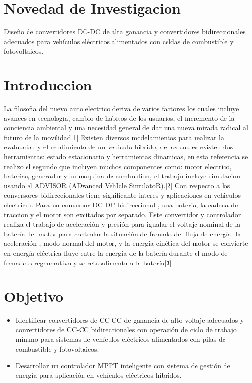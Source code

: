\documentclass[12pt]{article}
\begin{document}
\section{Novedad de Investigacion}
Diseño de convertidores DC-DC de alta ganancia y convertidores bidireccionales adecuados para vehículos eléctricos alimentados con celdas de combustible y fotovoltaicos.

\section{Introduccion}
La filosofia del nuevo auto electrico deriva de varios factores los cuales incluye avances en tecnologia, cambio de habitos de los usuarios, el incremento de la conciencia ambiental y una necesidad general de dar una nueva mirada radical al futuro de la movilidad[1]
Existen diversos modelamientos para realizar la evaluacion y el rendimiento de un vehiculo hibrido, de los cuales existen dos herramientas: estado estacionario y herramientas dinamicas, en esta referencia se realizo el segundo que incluyen muchos componentes como: motor electrico, baterias, generador y su maquina de combustion, el trabajo incluye simulacion usando el ADVISOR (ADvanced VehIcle SimulatoR).[2]
Con respecto a los conversores bidireccionales tiene significante interes y aplicaciones en vehiculos electricos. Para un conversor DC-DC bidireccional , una bateria, la cadena de traccion y el motor son excitados por separado. Este convertidor y controlador realiza el trabajo de aceleración y presión para igualar el voltaje nominal de la batería del motor para controlar la situación de frenado del flujo de energía.
la aceleración , modo normal del motor, y la energía cinética del motor se convierte en energía eléctrica fluye entre la energía de la batería durante el modo de frenado o regenerativo y se retroalimenta a la batería[3]






\section{Objetivo}
\begin{itemize}
	\item Identificar convertidores de CC-CC de ganancia de alto voltaje adecuados y convertidores de CC-CC bidireccionales con operación de ciclo de trabajo mínimo para sistemas de vehículos eléctricos alimentados con pilas de combustible y fotovoltaicos.
	\item Desarrollar un controlador MPPT inteligente con sistema de gestión de energía para aplicación en vehículos eléctricos híbridos.
\end{itemize}
\end{document}
